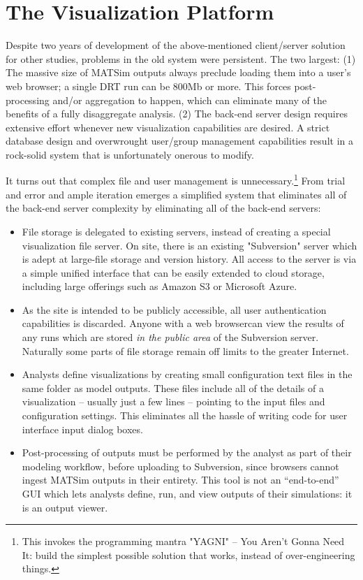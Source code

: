 \section{The Visualization Platform}
\label{avov-platform}

Despite two years of development of the above-mentioned client/server solution for other studies, problems in the old system were persistent. The two largest: (1) The massive size of MATSim outputs always preclude loading them into a user's web browser; a single DRT run can be 800Mb or more. This forces post-processing and/or aggregation to happen, which can eliminate many of the benefits of a fully disaggregate analysis. (2) The back-end server design requires extensive effort whenever new visualization capabilities are desired. A strict database design and overwrought user/group management capabilities result in a rock-solid system that is unfortunately onerous to modify.

It turns out that complex file and user management is unnecessary.\footnote{This invokes the programming mantra "YAGNI" -- You Aren't Gonna Need It: build the simplest possible solution that works, instead of over-engineering things.} From trial and error and ample iteration emerges a simplified system that eliminates all of the back-end server complexity by eliminating all of the back-end servers:

\begin{itemize}
  \item File storage is delegated to existing servers, instead of creating a special visualization file server. On site, there is an existing "Subversion" server \cite{Fitzpatrick2004Subversion} which is adept at large-file storage and version history. All access to the server is via a simple unified interface that can be easily extended to cloud storage, including large offerings such as Amazon S3 or Microsoft Azure.

  \item As the site is intended to be publicly accessible, all user authentication capabilities is discarded. Anyone with a web browsercan view the results of any runs which are stored \emph{in the public area} of the Subversion server. Naturally some parts of file storage remain off limits to the greater Internet.

  \item Analysts define visualizations by creating small configuration text files in the same folder as model outputs. These files include all of the details of a visualization -- usually just a few lines -- pointing to the input files and configuration settings. This eliminates all the hassle of writing code for user interface input dialog boxes.

  \item Post-processing of outputs must be performed by the analyst as part of their modeling workflow, before uploading to Subversion, since browsers cannot ingest MATSim outputs in their entirety. This tool is not an ``end-to-end'' GUI which lets analysts define, run, and view outputs of their simulations: it is an output viewer.
\end{itemize}

